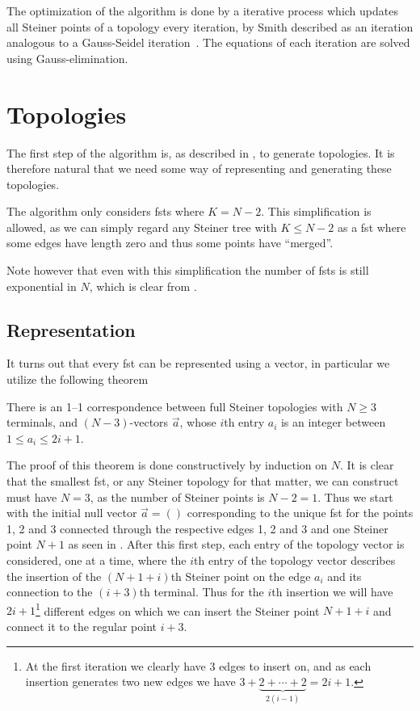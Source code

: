 The optimization of the algorithm is done by a iterative process which updates
all Steiner points of a topology every iteration, by Smith described as an
iteration analogous to a Gauss-Seidel iteration~\cite[p.~145]{Smith1992}. The
equations of each iteration are solved using Gauss-elimination.


\section{Topologies}
\label{sec:topologies}

The first step of the algorithm is, as described in , to
generate topologies. It is therefore natural that we need some way of
representing and generating these topologies.

The algorithm only considers \glspl{fst} where $K = N - 2$. This simplification
is allowed, as we can simply regard any Steiner tree with $K \le N - 2$ as a
\gls{fst} where some edges have length zero and thus some points have
``merged''.

Note however that even with this simplification the number of \glspl{fst} is
still exponential in $N$, which is clear from .

\subsection{Representation}
\label{sec:representation}

It turns out that every \gls{fst} can be represented using a vector, in
particular we utilize the following theorem

\begin{theorem}
There is an 1--1 correspondence between full Steiner topologies with $N \ge 3$
terminals, and $(N-3)$-vectors $\vec{a}$, whose $i$th entry $a_i$ is an
integer between $1 \le a_i \le 2 i + 1$.
\end{theorem}

The proof of this theorem is done constructively by induction on $N$. It is
clear that the smallest \gls{fst}, or any Steiner topology for that matter, we
can construct must have $N = 3$, as the number of Steiner points is $N - 2 = 1$.
Thus we start with the initial null vector $\vec{a} = ()$ corresponding to the
unique \gls{fst} for the points 1, 2 and 3 connected through the respective
edges 1, 2 and 3 and one Steiner point $N+1$ as seen in
. After this first step, each entry of the
topology vector is considered, one at a time, where the $i$th entry of the
topology vector describes the insertion of the $(N+1+i)$th Steiner point on the
edge $a_{i}$ and its connection to the $(i+3)$th terminal. Thus for the
$i$th insertion we will have $2i+1$\footnote{At the first iteration we clearly
  have 3 edges to insert on, and as each insertion generates two new edges we
  have $3 + \underbrace{2 + \cdots + 2}_{2 (i - 1)} = 2 i + 1$.} different edges
on which we can insert the Steiner point $N+1+i$ and connect it to the regular
point $i+3$.

